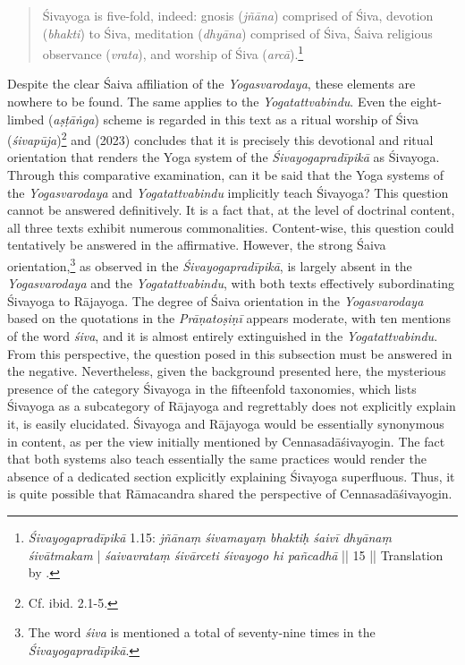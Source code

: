 \begin{quote}
  Śivayoga is five-fold, indeed: gnosis (\textit{jñāna}) comprised of Śiva, devotion (\textit{bhakti}) to Śiva,
meditation (\textit{dhyāna}) comprised of Śiva, Śaiva religious observance (\textit{vrata}), and worship of Śiva
(\textit{arcā}).\footnote{\textit{Śivayogapradīpikā} 1.15: \textit{jñānaṃ śivamayaṃ bhaktiḥ śaivī dhyānaṃ śivātmakam} | \textit{śaivavrataṃ śivārceti śivayogo hi pañcadhā} || 15 || Translation by \citeauthor[2023: 315]{powell2023}.} 
  \end{quote}
Despite the clear Śaiva affiliation of the \textit{Yogasvarodaya}, these elements are nowhere to be found. The same applies to the \textit{Yogatattvabindu}. Even the eight-limbed (\textit{aṣṭāṅga}) scheme is regarded in this text as a ritual worship of Śiva (\textit{śivapūja})\footnote{Cf. ibid. 2.1-5.} and \citeauthor{powell2023} (2023) concludes that it is precisely this devotional and ritual orientation that renders the Yoga system of the \textit{Śivayogapradīpikā} as Śivayoga.
Through this comparative examination, can it be said that the Yoga systems of the \textit{Yogasvarodaya} and \textit{Yogatattvabindu} implicitly teach Śivayoga? This question cannot be answered definitively. It is a fact that, at the level of doctrinal content, all three texts exhibit numerous commonalities. Content-wise, this question could tentatively be answered in the affirmative. However, the strong Śaiva orientation,\footnote{The word \textit{śiva} is mentioned a total of seventy-nine times in the \textit{Śivayogapradīpikā}.} as observed in the \textit{Śivayogapradīpikā}, is largely absent in the \textit{Yogasvarodaya} and the \textit{Yogatattvabindu}, with both texts effectively subordinating Śivayoga to Rājayoga. The degree of Śaiva orientation in the \textit{Yogasvarodaya} based on the quotations in the \emph{Prāṇatoṣiṇī} appears moderate, with ten mentions of the word \textit{śiva}, and it is almost entirely extinguished in the \textit{Yogatattvabindu}. From this perspective, the question posed in this subsection must be answered in the negative. Nevertheless, given the background presented here, the mysterious presence of the category Śivayoga in the fifteenfold taxonomies, which lists Śivayoga as a subcategory of Rājayoga and regrettably does not explicitly explain it, is easily elucidated. Śivayoga and Rājayoga would be essentially synonymous in content, as per the view initially mentioned by Cennasadāśivayogin. The fact that both systems also teach essentially the same practices would render the absence of a dedicated section explicitly explaining Śivayoga superfluous. Thus, it is quite possible that Rāmacandra shared the perspective of Cennasadāśivayogin.
